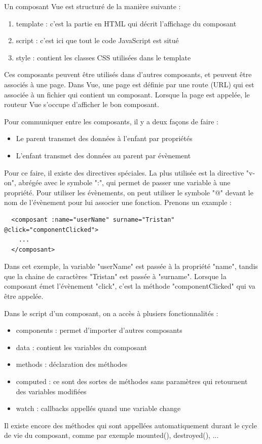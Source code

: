 \documentclass[
    iai, %
    eai, %
]{heig-tb}
\begin{document}
Un composant Vue est structuré de la manière suivante :
\begin{enumerate}
  \item template : c'est la partie en HTML qui décrit l'affichage du composant
  \item script : c'est ici que tout le code JavaScript est situé
  \item style : contient les classes CSS utilisées dans le template
\end{enumerate}
\bigskip
Ces composants peuvent être utilisés dans d'autres composants, et peuvent être associés à une page.
Dans Vue, une page est définie par une route (URL) qui est associée à un fichier qui contient un composant.
Lorsque la page est appelée, le routeur Vue s'occupe d'afficher le bon composant.

Pour communiquer entre les composants, il y a deux façons de faire :
\begin{itemize}
  \item Le parent transmet des données à l'enfant par propriétés
  \item L'enfant transmet des données au parent par évènement
\end{itemize}
\bigskip
\newpage

Pour ce faire, il existe des directives spéciales.
La plus utilisée est la directive "v-on", abrégée avec le symbole ":", qui permet de passer une variable à une propriété.
Pour utiliser les évènements, on peut utiliser le symbole "@" devant le nom de l'évènement pour lui associer une fonction.
Prenons un example :
\begin{verbatim}
  <composant :name="userName" surname="Tristan" @click="componentClicked">
    ...
  </composant>
\end{verbatim}
Dans cet exemple, la variable "userName" est passée à la propriété "name", tandis que la chaine de caractères "Tristan" est passée à "surname".
Lorsque la composant émet l'évènement "click", c'est la méthode "componentClicked" qui va être appelée.

Dans le script d'un composant, on a accès à plusiers fonctionnalités :
\begin{itemize}
  \item components : permet d'importer d'autres composants
  \item data : contient les variables du composant
  \item methods : déclaration des méthodes
  \item computed : ce sont des sortes de méthodes sans paramètres qui retournent des variables modifiées
  \item watch : callbacks appellés quand une variable change
\end{itemize}
\bigskip
Il existe encore des méthodes qui sont appellées automatiquement durant le cycle de vie du composant, comme par exemple mounted(), destroyed(), ...
\newpage
\inputminted[breaklines]{html}{assets/code/component_example.vue}
\end{document}
